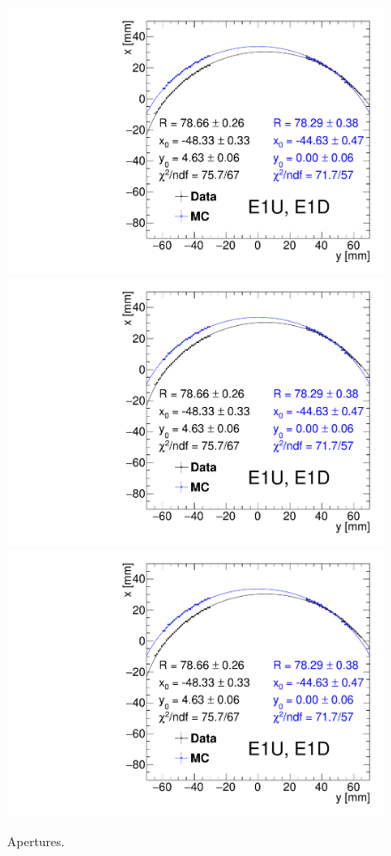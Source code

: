 \begin{figure}[hb]%
\caption[Apertures.]{Apertures.}\label{fig:aperturesWithFit}%
\centering
\parbox{0.495\textwidth}{
  \centering
  \includegraphics[width=\linewidth,page=1]{graphics/rpSim/Apertures_swapedAxes_withFit_beforeDxShift.pdf}\\
  \includegraphics[width=\linewidth,page=2]{graphics/rpSim/Apertures_swapedAxes_withFit_beforeDxShift.pdf}\\
  \includegraphics[width=\linewidth,page=3]{graphics/rpSim/Apertures_swapedAxes_withFit_beforeDxShift.pdf}
}
\end{figure}
